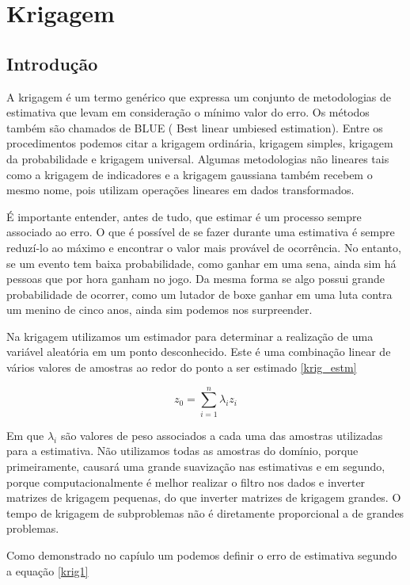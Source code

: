 \chapter{Krigagem}

\section{Introdução} \label{secao1}

A krigagem é um termo genérico que expressa um conjunto de metodologias de estimativa que levam em consideração o mínimo valor do erro. Os métodos também são chamados de BLUE ( Best linear umbiesed estimation). Entre os procedimentos podemos citar a krigagem ordinária, krigagem simples, krigagem da probabilidade e krigagem universal. Algumas metodologias não lineares tais como a krigagem de indicadores e a krigagem gaussiana também recebem o mesmo nome, pois utilizam operações lineares em dados transformados. 

É importante entender, antes de tudo, que estimar é um processo sempre associado ao erro. O que é possível de se fazer durante uma estimativa é sempre reduzí-lo ao máximo e encontrar o valor mais provável de ocorrência. No entanto, se um evento tem baixa probabilidade, como ganhar em uma sena, ainda sim há pessoas que por hora ganham no jogo. Da mesma forma se algo possui grande probabilidade de ocorrer, como um lutador de boxe ganhar em uma luta contra um menino de cinco anos, ainda sim podemos nos surpreender.

Na krigagem utilizamos um estimador para determinar a realização de uma variável aleatória em um ponto desconhecido. Este é uma combinação linear de vários valores de amostras ao redor do ponto a ser estimado \eqref{krig_estm}

\begin{equation}\label{krig_estm}
z_{0} = \sum_{i=1}^{n} \lambda_{i} z_{i} 
\end{equation}

Em que $\lambda_{i}$ são valores de peso associados a cada uma das amostras utilizadas para a estimativa. Não utilizamos todas as amostras do domínio, porque primeiramente, causará uma grande suavização nas estimativas e em segundo, porque computacionalmente é melhor realizar o filtro nos dados e inverter matrizes de krigagem pequenas, do que inverter matrizes de krigagem grandes. O tempo de krigagem de subproblemas não é diretamente proporcional a de grandes problemas. 


Como demonstrado no capíulo um podemos definir o erro de estimativa segundo a equação \eqref{krig1}


